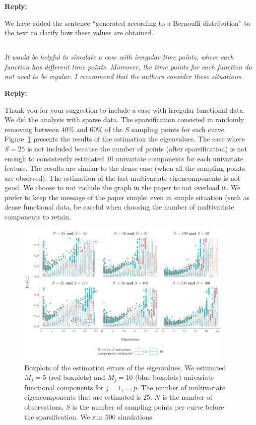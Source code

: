 \documentclass[12pt,a4paper]{article}
\newcommand{\comments}[1]{\subsection{}
\begin{mdframed}[style=comments] 
        \textit{#1}
\end{mdframed}}
\newcommand{\reply}[1]{
    \noindent\textbf{Reply:}

\begin{mdframed}[style=replies] 
    #1
\end{mdframed}
}
\begin{document}
\reply{We have added the sentence ``generated according to a Bernoulli distribution'' to the text to clarify how these values are obtained.}


\comments{It would be helpful to simulate a case with irregular time points, where each function has different time points. Moreover, the time points for each function do not need to be regular. I recommend that the authors consider these situations.}

\reply{Thank you for your suggestion to include a case with irregular functional data. We did the analysis with sparse data. The sparsification consisted in randomly removing between $40\%$ and $60\%$ of the $S$ sampling points for each curve. Figure~\ref{fig:ncomp} presents the results of the estimation the eigenvalues. The case where $S = 25$ is not included because the number of points (after sparsification) is not enough to consistently estimated $10$ univariate components for each univariate feature. The results are similar to the dense case (when all the sampling points are observed). The estimation of the last multivariate eigencomponents is not good. We choose to not include the graph in the paper to not overload it. We prefer to keep the message of the paper simple: even in simple situation (such as dense functional data, be careful when choosing the number of multivariate components to retain.}
\begin{figure}
     \centering
    \includegraphics[width=0.94\textwidth]{ncomp.pdf}
    \caption{Boxplots of the estimation errors of the eigenvalues. We estimated $M_j = 5$ (red boxplots) and $M_j = 10$ (blue boxplots) univariate functional components for $j = 1, \dots, p$. The number of multivariate eigencomponents that are estimated is $25$. $N$ is the number of observations, $S$ is the number of sampling points per curve before the sparsification. We run $500$ simulations.}
    \label{fig:ncomp}
\end{figure}
\end{document}
